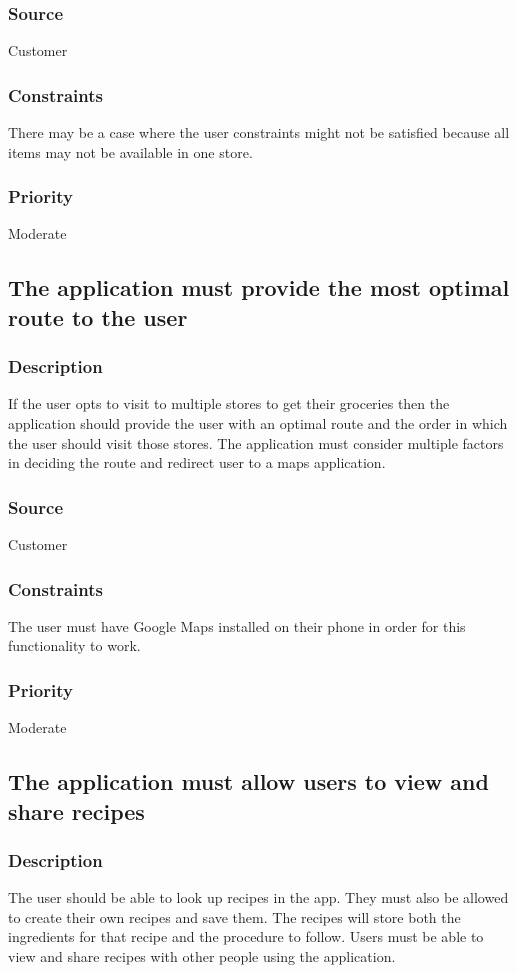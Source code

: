 \subsubsection{Source}
Customer
\subsubsection{Constraints}
There may be a case where the user constraints might not be satisfied because all items may not be available in one store.
\subsubsection{Priority}
Moderate\\

\subsection{The application must provide the most optimal route to the user}
\subsubsection{Description}
If the user opts to visit to multiple stores to get their groceries then the application should provide the user with an optimal route and the order in which the user should visit those stores. The application must consider multiple factors in deciding the route and redirect user to a maps application. 
\subsubsection{Source}
Customer
\subsubsection{Constraints}
The user must have Google Maps installed on their phone in order for this functionality to work.
\subsubsection{Priority}
Moderate\\

\subsection{The application must allow users to view and share recipes}
\subsubsection{Description}
The user should be able to look up recipes in the app. They must also be allowed to create their own recipes and save them. The recipes will store both the ingredients for that recipe and the procedure to follow. Users must be able to view and share recipes with other people using the application.
